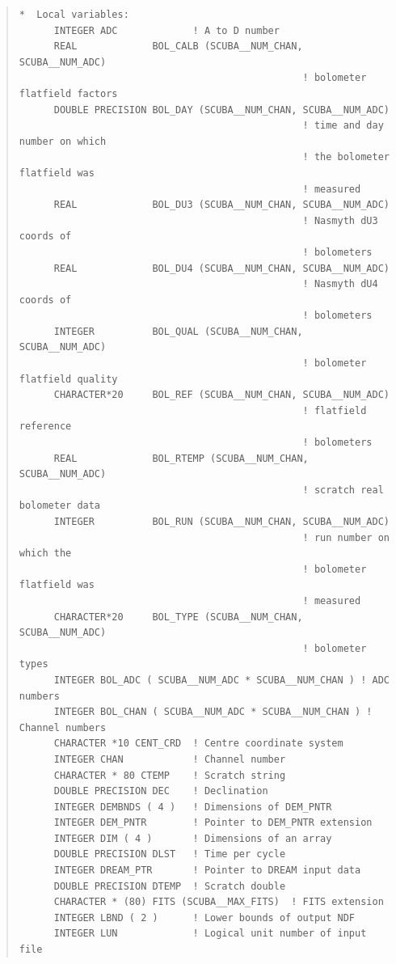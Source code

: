 \documentclass[twoside,11pt]{article}
\newenvironment{myquote}{\begin{quote}\begin{small}}{\end{small}\end{quote}}
\renewcommand{\_}{\texttt{\symbol{95}}}
\begin{document}
\begin{myquote}
\begin{verbatim}
*  Local variables:
      INTEGER ADC             ! A to D number
      REAL             BOL_CALB (SCUBA__NUM_CHAN, SCUBA__NUM_ADC)
                                                 ! bolometer flatfield factors
      DOUBLE PRECISION BOL_DAY (SCUBA__NUM_CHAN, SCUBA__NUM_ADC)
                                                 ! time and day number on which
                                                 ! the bolometer flatfield was
                                                 ! measured
      REAL             BOL_DU3 (SCUBA__NUM_CHAN, SCUBA__NUM_ADC)
                                                 ! Nasmyth dU3 coords of
                                                 ! bolometers
      REAL             BOL_DU4 (SCUBA__NUM_CHAN, SCUBA__NUM_ADC)
                                                 ! Nasmyth dU4 coords of
                                                 ! bolometers
      INTEGER          BOL_QUAL (SCUBA__NUM_CHAN, SCUBA__NUM_ADC)
                                                 ! bolometer flatfield quality
      CHARACTER*20     BOL_REF (SCUBA__NUM_CHAN, SCUBA__NUM_ADC)
                                                 ! flatfield reference
                                                 ! bolometers
      REAL             BOL_RTEMP (SCUBA__NUM_CHAN, SCUBA__NUM_ADC)
                                                 ! scratch real bolometer data
      INTEGER          BOL_RUN (SCUBA__NUM_CHAN, SCUBA__NUM_ADC)
                                                 ! run number on which the
                                                 ! bolometer flatfield was
                                                 ! measured
      CHARACTER*20     BOL_TYPE (SCUBA__NUM_CHAN, SCUBA__NUM_ADC)
                                                 ! bolometer types
      INTEGER BOL_ADC ( SCUBA__NUM_ADC * SCUBA__NUM_CHAN ) ! ADC numbers
      INTEGER BOL_CHAN ( SCUBA__NUM_ADC * SCUBA__NUM_CHAN ) ! Channel numbers
      CHARACTER *10 CENT_CRD  ! Centre coordinate system
      INTEGER CHAN            ! Channel number
      CHARACTER * 80 CTEMP    ! Scratch string
      DOUBLE PRECISION DEC    ! Declination
      INTEGER DEMBNDS ( 4 )   ! Dimensions of DEM_PNTR
      INTEGER DEM_PNTR        ! Pointer to DEM_PNTR extension
      INTEGER DIM ( 4 )       ! Dimensions of an array
      DOUBLE PRECISION DLST   ! Time per cycle
      INTEGER DREAM_PTR       ! Pointer to DREAM input data
      DOUBLE PRECISION DTEMP  ! Scratch double
      CHARACTER * (80) FITS (SCUBA__MAX_FITS)  ! FITS extension
      INTEGER LBND ( 2 )      ! Lower bounds of output NDF
      INTEGER LUN             ! Logical unit number of input file

\end{verbatim}
\end{myquote}
\end{document}
